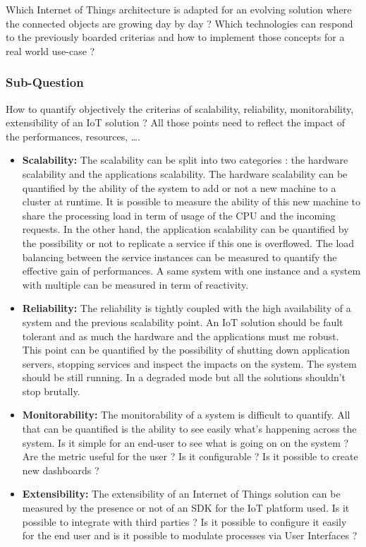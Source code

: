 \documentclass[11pt]{article}
\begin{document}
Which Internet of Things architecture is adapted for an evolving solution where the connected objects are growing day by day ? Which technologies can respond to the previously boarded criterias and how to implement those concepts for a real world use-case ? 

\subsubsection{Sub-Question}

How to quantify objectively the criterias of scalability, reliability, monitorability, extensibility of an IoT solution ? All those points need to reflect the impact of the performances, resources, \ldots.

\begin{itemize}
	\item \textbf{Scalability:} The scalability can be split into two categories : the hardware scalability and the applications scalability. The hardware scalability can be quantified by the ability of the system to add or not a new machine to a cluster at runtime. It is possible to measure the ability of this new machine to share the processing load in term of usage of the CPU and the incoming requests. In the other hand, the application scalability can be quantified by the possibility or not to replicate a service if this one is overflowed. The load balancing between the service instances can be measured to quantify the effective gain of performances. A same system with one instance and a system with multiple can be measured in term of reactivity. 
	
	\item \textbf{Reliability:} The reliability is tightly coupled with the high availability of a system and the previous scalability point. An IoT solution should be fault tolerant and as much the hardware and the applications must me robust. This point can be quantified by the possibility of shutting down application servers, stopping services and inspect the impacts on the system. The system should be still running. In a degraded mode but all the solutions shouldn't stop brutally.

	\item \textbf{Monitorability:} The monitorability of a system is difficult to quantify. All that can be quantified is the ability to see easily what's happening across the system. Is it simple for an end-user to see what is going on on the system ? Are the metric useful for the user ? Is it configurable ? Is it possible to create new dashboards ?

	\item \textbf{Extensibility:} The extensibility of an Internet of Things solution can be measured by the presence or not of an SDK for the IoT platform used. Is it possible to integrate with third parties ? Is it possible to configure it easily for the end user and is it possible to modulate processes via User Interfaces ? 
	
\end{itemize}
\end{document}
